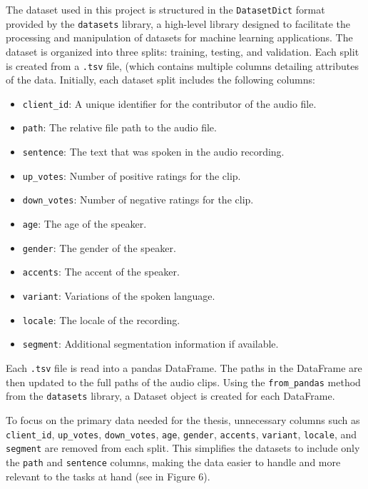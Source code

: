 \documentclass[conference]{IEEEtran}
\begin{document}
The dataset used in this project is structured in the \texttt{DatasetDict} format provided by the \texttt{datasets} library, a high-level library designed to facilitate the processing and manipulation of datasets for machine learning applications. The dataset is organized into three splits: training, testing, and validation. Each split is created from a \texttt{.tsv} file, (which contains multiple columns detailing attributes of the data. Initially, each dataset split includes the following columns:
\begin{itemize}
    \item \texttt{client\_id}: A unique identifier for the contributor of the audio file.
    \item \texttt{path}: The relative file path to the audio file.
    \item \texttt{sentence}: The text that was spoken in the audio recording.
    \item \texttt{up\_votes}: Number of positive ratings for the clip.
    \item \texttt{down\_votes}: Number of negative ratings for the clip.
    \item \texttt{age}: The age of the speaker.
    \item \texttt{gender}: The gender of the speaker.
    \item \texttt{accents}: The accent of the speaker.
    \item \texttt{variant}: Variations of the spoken language.
    \item \texttt{locale}: The locale of the recording.
    \item \texttt{segment}: Additional segmentation information if available.
\end{itemize}

Each \texttt{.tsv} file is read into a pandas DataFrame. The paths in the DataFrame are then updated to the full paths of the audio clips. Using the \texttt{from\_pandas} method from the \texttt{datasets} library, a Dataset object is created for each DataFrame.

To focus on the primary data needed for the thesis, unnecessary columns such as \texttt{client\_id}, \texttt{up\_votes}, \texttt{down\_votes}, \texttt{age}, \texttt{gender}, \texttt{accents}, \texttt{variant}, \texttt{locale}, and \texttt{segment} are removed from each split. This simplifies the datasets to include only the \texttt{path} and \texttt{sentence} columns, making the data easier to handle and more relevant to the tasks at hand (see in Figure 6).
\end{document}
